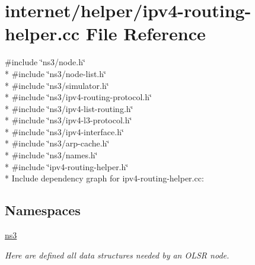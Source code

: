 \hypertarget{ipv4-routing-helper_8cc}{}\section{internet/helper/ipv4-\/routing-\/helper.cc File Reference}
\label{ipv4-routing-helper_8cc}
{\ttfamily \#include \char`\"{}ns3/node.\+h\char`\"{}}\\*
{\ttfamily \#include \char`\"{}ns3/node-\/list.\+h\char`\"{}}\\*
{\ttfamily \#include \char`\"{}ns3/simulator.\+h\char`\"{}}\\*
{\ttfamily \#include \char`\"{}ns3/ipv4-\/routing-\/protocol.\+h\char`\"{}}\\*
{\ttfamily \#include \char`\"{}ns3/ipv4-\/list-\/routing.\+h\char`\"{}}\\*
{\ttfamily \#include \char`\"{}ns3/ipv4-\/l3-\/protocol.\+h\char`\"{}}\\*
{\ttfamily \#include \char`\"{}ns3/ipv4-\/interface.\+h\char`\"{}}\\*
{\ttfamily \#include \char`\"{}ns3/arp-\/cache.\+h\char`\"{}}\\*
{\ttfamily \#include \char`\"{}ns3/names.\+h\char`\"{}}\\*
{\ttfamily \#include \char`\"{}ipv4-\/routing-\/helper.\+h\char`\"{}}\\*
Include dependency graph for ipv4-\/routing-\/helper.cc\+:
\subsection*{Namespaces}
\begin{DoxyCompactItemize}
\item 
 \hyperlink{namespacens3}{ns3}
\begin{DoxyCompactList}\small\item\em Here are defined all data structures needed by an O\+L\+SR node. \end{DoxyCompactList}\end{DoxyCompactItemize}

